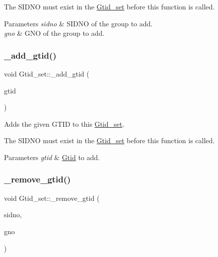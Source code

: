 The S\+I\+D\+NO must exist in the \mbox{\hyperlink{classGtid__set}{Gtid\+\_\+set}} before this function is called.


\begin{DoxyParams}{Parameters}
{\em sidno} & S\+I\+D\+NO of the group to add. \\
\hline
{\em gno} & G\+NO of the group to add. \\
\hline
\end{DoxyParams}
\mbox{\label{classGtid__set_afbd9dcbc89a4d8c7a3ab9c518302039b}} 
\subsubsection{\texorpdfstring{\+\_\+add\+\_\+gtid()}{\_add\_gtid()}\hspace{0.1cm}{\footnotesize\ttfamily [2/2]}}
{\footnotesize\ttfamily void Gtid\+\_\+set\+::\+\_\+add\+\_\+gtid (\begin{DoxyParamCaption}\item[{const \mbox{\hyperlink{structGtid}{Gtid}} \&}]{gtid }\end{DoxyParamCaption})\hspace{0.3cm}{\ttfamily [inline]}}

Adds the given G\+T\+ID to this \mbox{\hyperlink{classGtid__set}{Gtid\+\_\+set}}.

The S\+I\+D\+NO must exist in the \mbox{\hyperlink{classGtid__set}{Gtid\+\_\+set}} before this function is called.


\begin{DoxyParams}{Parameters}
{\em gtid} & \mbox{\hyperlink{structGtid}{Gtid}} to add. \\
\hline
\end{DoxyParams}
\mbox{\label{classGtid__set_aed076ca0f25c0c25c718abe4cc5c27ed}} 
\subsubsection{\texorpdfstring{\+\_\+remove\+\_\+gtid()}{\_remove\_gtid()}\hspace{0.1cm}{\footnotesize\ttfamily [1/2]}}
{\footnotesize\ttfamily void Gtid\+\_\+set\+::\+\_\+remove\+\_\+gtid (\begin{DoxyParamCaption}\item[{rpl\+\_\+sidno}]{sidno,  }\item[{rpl\+\_\+gno}]{gno }\end{DoxyParamCaption})\hspace{0.3cm}{\ttfamily [inline]}}

